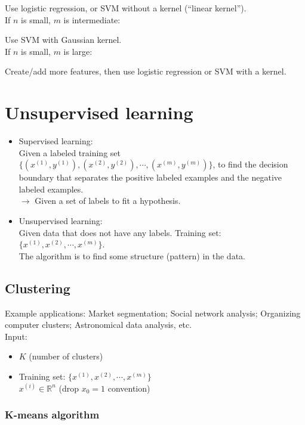 Use logistic regression, or SVM without a kernel (``linear kernel'').\\
If $n$ is small, $m$ is intermediate:

Use SVM with Gaussian kernel.\\
If $n$ is small, $m$ is large:

Create/add more features, then use logistic regression or SVM with a kernel.

\section{Unsupervised learning}
\label{sec:Unsupervised learning}

\begin{itemize}
\item
Supervised learning:\\
Given a labeled training set $\{(x^{(1)}, y^{(1)}), (x^{(2)}, y^{(2)}), \cdots, (x^{(m)}, y^{(m)})\}$, to find the decision boundary that separates the positive labeled examples and the negative labeled examples.\\
$\rightarrow$ Given a set of labels to fit a hypothesis.
\item
Unsupervised learning:\\
Given data that does not have any labels. Training set: $\{x^{(1)}, x^{(2)},\cdots, x^{(m)}\}$.\\
The algorithm is to find some structure (pattern) in the data.
\end{itemize}
%
\subsection{Clustering}
Example applications: Market segmentation; Social network analysis; Organizing computer clusters; Astronomical data analysis, etc.\\

Input:
\begin{itemize}
\item
$K$ (number of clusters)
\item
Training set: $\{x^{(1)}, x^{(2)},\cdots, x^{(m)}\}$\\
$x^{(i)} \in \mathbb{R}^n$ (drop $x_0 = 1$ convention)
\end{itemize}

\subsubsection{K-means algorithm}

